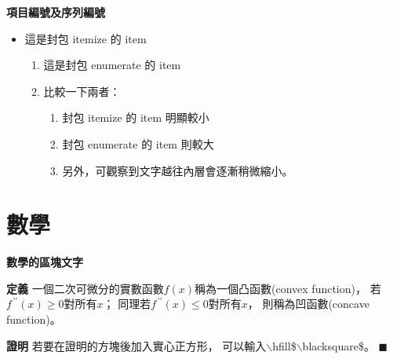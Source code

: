 \documentclass[12pt, aspectratio=169]{beamer}
\begin{document}
\linespread{1} 
\begin{frame}[<+>]{\textbf{項目編號及序列編號}}
\linespread{1.5} 

	\begin{itemize}[] %
		\item 這是封包 itemize 的 item
		\begin{enumerate}[] %
			\item 這是封包 enumerate 的 item
			\item 比較一下兩者：
				\begin{enumerate}[1] %
					\item 封包 itemize 的 item 明顯較小
					\item 封包 enumerate 的 item 則較大
					\item 另外，可觀察到文字越往內層會逐漸稍微縮小。
				\end{enumerate}
		\end{enumerate}
	\end{itemize}
	
\end{frame}


\section{數學}


\linespread{1} 
\begin{frame}{\textbf{數學的區塊文字}}
\linespread{1.5}

	\begin{block}{\textbf{定義}} 
		一個二次可微分的實數函數$f\left(x\right)$稱為一個凸函數(convex function)，
		若$f^{\,\prime\prime}\!\left(x\right)\ge0$對所有$x$；
		同理若$f^{\,\prime\prime}\!\left(x\right)\le0$對所有$x$，
		則稱為凹函數(concave function)。
	\end{block}
	
	\begin{block}{\textbf{證明}} 
		若要在證明的方塊後加入實心正方形，
		可以輸入$\backslash$hfill\$$\backslash$blacksquare\$。
		\hfill$\blacksquare$
	\end{block}
	
\end{frame}
\end{document}
